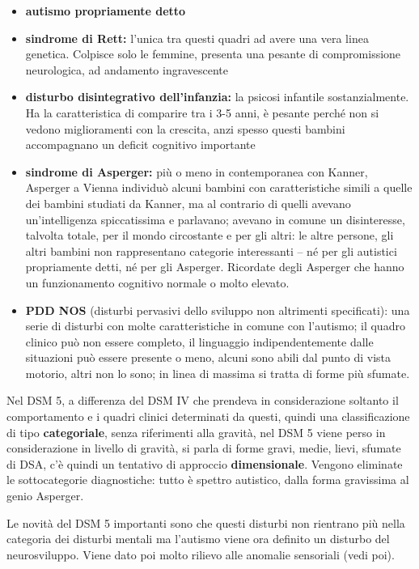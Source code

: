 \documentclass[]{article}
\begin{document}
\begin{itemize}
\item
  \textbf{autismo propriamente detto}
\item
  \textbf{sindrome di Rett:} l'unica tra questi quadri ad avere una vera
  linea genetica. Colpisce solo le femmine, presenta una pesante di
  compromissione neurologica, ad andamento ingravescente
\item
  \textbf{disturbo disintegrativo dell'infanzia:} la psicosi infantile
  sostanzialmente. Ha la caratteristica di comparire tra i 3-5 anni, è
  pesante perché non si vedono miglioramenti con la crescita, anzi
  spesso questi bambini accompagnano un deficit cognitivo importante
\item
  \textbf{sindrome di Asperger:} più o meno in contemporanea con Kanner,
  Asperger a Vienna individuò alcuni bambini con caratteristiche simili
  a quelle dei bambini studiati da Kanner, ma al contrario di quelli
  avevano un'intelligenza spiccatissima e parlavano; avevano in comune
  un disinteresse, talvolta totale, per il mondo circostante e per gli
  altri: le altre persone, gli altri bambini non rappresentano categorie
  interessanti -- né per gli autistici propriamente detti, né per gli
  Asperger. Ricordate degli Asperger che hanno un funzionamento
  cognitivo normale o molto elevato.
\item
  \textbf{PDD NOS} (disturbi pervasivi dello sviluppo non altrimenti
  specificati): una serie di disturbi con molte caratteristiche in
  comune con l'autismo; il quadro clinico può non essere completo, il
  linguaggio indipendentemente dalle situazioni può essere presente o
  meno, alcuni sono abili dal punto di vista motorio, altri non lo sono;
  in linea di massima si tratta di forme più sfumate.
\end{itemize}

Nel DSM 5, a differenza del DSM IV che prendeva in considerazione
soltanto il comportamento e i quadri clinici determinati da questi,
quindi una classificazione di tipo \textbf{categoriale}, senza
riferimenti alla gravità, nel DSM 5 viene perso in considerazione in
livello di gravità, si parla di forme gravi, medie, lievi, sfumate di
DSA, c'è quindi un tentativo di approccio \textbf{dimensionale}. Vengono
eliminate le sottocategorie diagnostiche: tutto è spettro autistico,
dalla forma gravissima al genio Asperger.

Le novità del DSM 5 importanti sono che questi disturbi non rientrano
più nella categoria dei disturbi mentali ma l'autismo viene ora definito
un disturbo del neurosviluppo. Viene dato poi molto rilievo alle
anomalie sensoriali (vedi poi).
\end{document}
